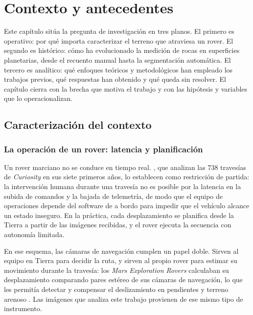 \chapter{Contexto y antecedentes}
\label{cap:contexto}

Este capítulo sitúa la pregunta de investigación en tres planos. El primero es operativo:
por qué importa caracterizar el terreno que atraviesa un rover. El segundo es histórico:
cómo ha evolucionado la medición de rocas en superficies planetarias, desde el recuento
manual hasta la segmentación automática. El tercero es analítico: qué enfoques teóricos y
metodológicos han empleado los trabajos previos, qué respuestas han obtenido y qué queda sin
resolver. El capítulo cierra con la brecha que motiva el trabajo y con las hipótesis y
variables que lo operacionalizan.

\section{Caracterización del contexto}
\label{sec:contexto}

\subsection{La operación de un rover: latencia y planificación}
\label{sec:operacion}

Un rover marciano no se conduce en tiempo real. \citet{rankin2020mobility}, que analizan las
\num{738} travesías de \textit{Curiosity} en sus siete primeros años, lo establecen como
restricción de partida: la intervención humana durante una travesía no es posible por la
latencia en la subida de comandos y la bajada de telemetría, de modo que el equipo de
operaciones depende del software de a bordo para impedir que el vehículo alcance un estado
inseguro. En la práctica, cada desplazamiento se planifica desde la Tierra a
partir de las imágenes recibidas, y el rover ejecuta la secuencia con autonomía limitada.

En ese esquema, las cámaras de navegación cumplen un papel doble. Sirven al equipo en Tierra
para decidir la ruta, y sirven al propio rover para estimar su movimiento durante la
travesía: los \textit{Mars Exploration Rovers} calculaban su desplazamiento comparando pares
estéreo de sus cámaras de navegación, lo que les permitía detectar y compensar el
deslizamiento en pendientes y terreno arenoso \citep{maimone2007vo}. Las imágenes que analiza
este trabajo provienen de ese mismo tipo de instrumento.

